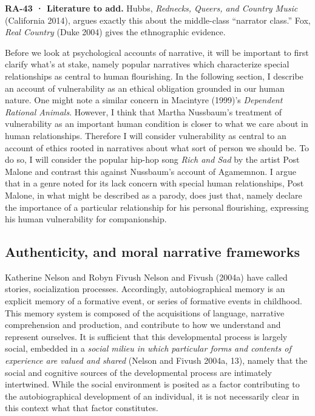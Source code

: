 \documentclass[
  letterpaper,
  DIV=11,
  numbers=noendperiod]{scrartcl}
\theoremstyle{remark}
\begin{document}
\begin{tcolorbox}[enhanced jigsaw, arc=.35mm, bottomrule=.15mm, bottomtitle=1mm, breakable, colback=white, colbacktitle=quarto-callout-tip-color!10!white, colframe=quarto-callout-tip-color-frame, coltitle=black, left=2mm, leftrule=.75mm, opacityback=0, opacitybacktitle=0.6, rightrule=.15mm, title=\textcolor{quarto-callout-tip-color}{\faLightbulb}\hspace{0.5em}{Tip}, titlerule=0mm, toprule=.15mm, toptitle=1mm]

\textbf{RA-43 · Literature to add.} Hubbs, \emph{Rednecks, Queers, and
Country Music} (California 2014), argues exactly this about the
middle-class ``narrator class.'' Fox, \emph{Real Country} (Duke 2004)
gives the ethnographic evidence.

\end{tcolorbox}

Before we look at psychological accounts of narrative, it will be
important to first clarify what's at stake, namely popular narratives
which characterize special relationships as central to human
flourishing. In the following section, I describe an account of
vulnerability as an ethical obligation grounded in our human nature. One
might note a similar concern in Macintyre (1999)'s \emph{Dependent
Rational Animals}. However, I think that Martha Nussbaum's treatment of
vulnerability as an important human condition is closer to what we care
about in human relationships. Therefore I will consider vulnerability as
central to an account of ethics rooted in narratives about what sort of
person we should be. To do so, I will consider the popular hip-hop song
\emph{Rich and Sad} by the artist Post Malone and contrast this against
Nussbaum's account of Agamemnon. I argue that in a genre noted for its
lack concern with special human relationships, Post Malone, in what
might be described as a parody, does just that, namely declare the
importance of a particular relationship for his personal flourishing,
expressing his human vulnerability for companionship.

\subsection{Authenticity, and moral narrative
frameworks}\label{authenticity-and-moral-narrative-frameworks}

Katherine Nelson and Robyn Fivush Nelson and Fivush (2004a) have called
stories, socialization processes. Accordingly, autobiographical memory
is an explicit memory of a formative event, or series of formative
events in childhood. This memory system is composed of the acquisitions
of language, narrative comprehension and production, and contribute to
how we understand and represent ourselves. It is sufficient that this
developmental process is largely social, embedded in a \emph{social
milieu in which particular forms and contents of experience are valued
and shared} (Nelson and Fivush 2004a, 13), namely that the social and
cognitive sources of the developmental process are intimately
intertwined. While the social environment is posited as a factor
contributing to the autobiographical development of an individual, it is
not necessarily clear in this context what that factor constitutes.
\end{document}
